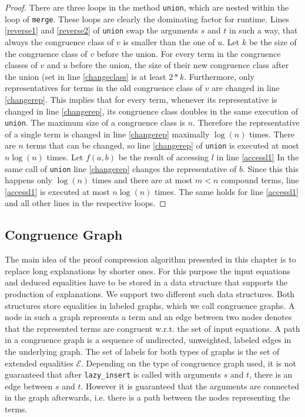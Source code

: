\begin{proof}

There are three loops in the method \texttt{union}, which are nested within the loop of \texttt{merge}.
These loops are clearly the dominating factor for runtime.
Lines \ref{reverse1} and \ref{reverse2} of \texttt{union} swap the arguments $s$ and $t$ in such a way, that always the congruence class of $v$ is smaller than the one of $u$.
Let $k$ be the size of the congruence class of $v$ before the union.
For every term in the congruence classes of $v$ and $u$ before the union, the size of their new congruence class after the union (set in line \ref{changeclass} is at least $2*k$.
Furthermore, only representatives for terms in the old congruence class of $v$ are changed in line \ref{changerep}.
This implies that for every term, whenever its representative is changed in line \ref{changerep}, its congruence class doubles in the same execution of \texttt{union}.
The maximum size of a congruence class is $n$.
Therefore the representative of a single term is changed in line \ref{changerep} maximally $\log(n)$ times.
There are $n$ terms that can be changed, so line \ref{changerep} of \texttt{union} is executed at most $n \log(n)$ times.
Let $f(a,b)$ be the result of accessing $l$ in line \ref{accessl1}
In the same call of \texttt{union} line \ref{changerep} changes the representative of $b$.
Since this this happens only $\log(n)$ times and there are at most $m < n$ compound terms, line \ref{accessl1} is executed at most $n \log(n)$ times.
The same holds for line \ref{accessl1} and all other lines in the respective loops.

\end{proof}


\FloatBarrier

\subsection*{Congruence Graph}
\label{sec:congruencegraph}
The main idea of the proof compression algorithm presented in this chapter is to replace long explanations by shorter ones.
For this purpose the input equations and deduced equalities have to be stored in a data structure that supports the production of explanations.
We support two different such data structures.
Both structures store equalities in labeled graphs, which we call congruence graphs.
A node in such a graph represents a term and an edge between two nodes denotes that the represented terms are congruent w.r.t. the set of input equations.
A path in a congruence graph is a sequence of undirected, unweighted, labeled edges in the underlying graph.
The set of labels for both types of graphs is the set of extended equalities $\mathcal{E}$.
Depending on the type of congruence graph used, it is not guaranteed that after \texttt{lazy\_insert} is called with arguments $s$ and $t$, there is an edge between $s$ and $t$.
However it is guaranteed that the arguments are connected in the graph afterwards, i.e. there is a path between the nodes representing the terms.

